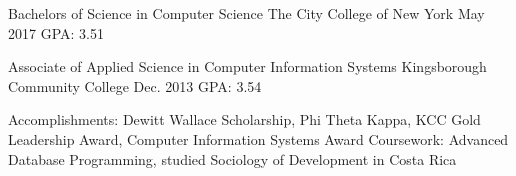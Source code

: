 \begin{cventries}
  \cventry
    {Bachelors of Science in Computer Science} %
    {The City College of New York} %
    {May 2017} %
    {GPA: 3.51} %
	{} %

  \cventry
    {Associate of Applied Science in Computer Information Systems} %
    {Kingsborough Community College} %
    {Dec. 2013} %
    {GPA: 3.54} %
    {
	  \begin{cvskills} %
		\cvskill
		  {Accomplishments:} %
		  {Dewitt Wallace Scholarship, Phi Theta Kappa, KCC Gold Leadership Award, Computer Information Systems Award} %
		\cvskill
		  {Coursework:} %
		  {Advanced Database Programming, studied Sociology of Development in Costa Rica} %
	  \end{cvskills}
	}
\end{cventries}
